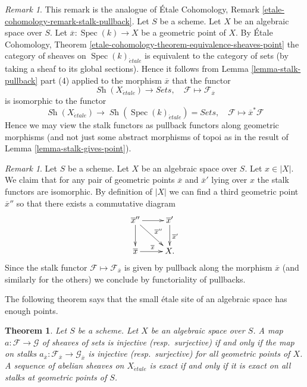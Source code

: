 \documentclass{stacks-project}
\theoremstyle{plain}
\newtheorem{theorem}[subsection]{Theorem}
\theoremstyle{definition}
\theoremstyle{remark}
\newtheorem{remark}[subsection]{Remark}
\numberwithin{equation}{subsection}
\def\Spec{\mathop{\mathrm{Spec}}}
\def\Sh{\mathop{\mathit{Sh}}\nolimits}
\def\etale{{\acute{e}tale}}
\begin{document}
\begin{remark}
\label{remark-stalk-pullback}
This remark is the analogue of
\'Etale Cohomology, Remark \ref{etale-cohomology-remark-stalk-pullback}.
Let $S$ be a scheme.
Let $X$ be an algebraic space over $S$.
Let $\overline{x} : \Spec(k) \to X$ be a geometric point of $X$.
By
\'Etale Cohomology,
Theorem \ref{etale-cohomology-theorem-equivalence-sheaves-point}
the category of sheaves on $\Spec(k)_\etale$ is
equivalent to the category of sets (by taking a sheaf to its global sections).
Hence it follows from
Lemma \ref{lemma-stalk-pullback} part (4)
applied to the morphism $\overline{x}$ that the functor
$$
\Sh(X_\etale) \longrightarrow \textit{Sets}, \quad
\mathcal{F} \longmapsto \mathcal{F}_{\overline{x}}
$$
is isomorphic to the functor
$$
\Sh(X_\etale)
\longrightarrow
\Sh(\Spec(k)_\etale) = \textit{Sets},
\quad
\mathcal{F} \longmapsto \overline{x}^*\mathcal{F}
$$
Hence we may view the stalk functors as pullback functors along
geometric morphisms (and not just some abstract morphisms of topoi
as in the result of
Lemma \ref{lemma-stalk-gives-point}).
\end{remark}

\begin{remark}
\label{remark-map-stalks}
Let $S$ be a scheme.
Let $X$ be an algebraic space over $S$.
Let $x \in |X|$.
We claim that for any pair of geometric points $\overline{x}$ and
$\overline{x}'$ lying over $x$ the stalk functors are isomorphic.
By definition of $|X|$ we can find a third geometric point
$\overline{x}''$ so that there exists a commutative diagram
$$
\xymatrix{
\overline{x}'' \ar[r] \ar[d] \ar[rd]^{\overline{x}''} &
\overline{x}' \ar[d]^{\overline{x}'} \\
\overline{x} \ar[r]^{\overline{x}} & X.
}
$$
Since the stalk functor $\mathcal{F} \mapsto \mathcal{F}_{\overline{x}}$
is given by pullback along the morphism $\overline{x}$ (and similarly for
the others) we conclude by functoriality of pullbacks.
\end{remark}




\noindent
The following theorem says that the small \'etale site of an algebraic
space has enough points.

\begin{theorem}
\label{theorem-exactness-stalks}
Let $S$ be a scheme. Let $X$ be an algebraic space over $S$.
A map $a : \mathcal{F} \to \mathcal{G}$ of sheaves of sets is injective
(resp.\ surjective) if and only if the map on stalks
$a_{\overline{x}} : \mathcal{F}_{\overline{x}} \to \mathcal{G}_{\overline{x}}$
is injective (resp.\ surjective) for all geometric points of $X$.
A sequence of abelian sheaves on $X_\etale$ is exact
if and only if it is exact on all stalks at geometric points of $S$.
\end{theorem}
\end{document}

